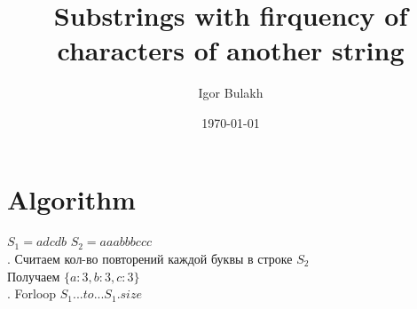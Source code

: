 \documentclass[a4paper,12pt]{article} %
\title{Substrings with firquency of characters of another string}
\author{Igor Bulakh}
\date{\today}
\begin{document}
\maketitle

\section{Algorithm}

\begin{flushleft}

$\displaystyle S_1=adcdb$\newline
$\displaystyle S_2=aaabbbccc$\\
. Считаем кол-во повторений каждой буквы в строке $S_2$\\
Получаем $\displaystyle \{a: 3, b: 3, c: 3\}$\\
. Forloop $S_1...to...S_1.size$\\

\bigskip

\end{flushleft}
\end{document}
